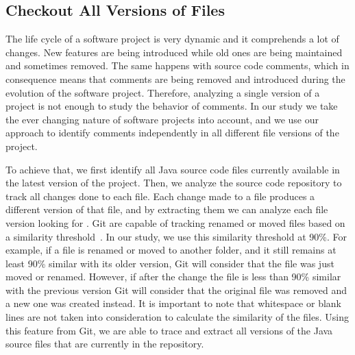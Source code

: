 \subsection{Checkout All Versions of Files}
\label{sub:checkout_all_versions_of_files}

The life cycle of a software project is very dynamic and it comprehends a lot of changes. New features are being introduced while old ones are being maintained and sometimes removed. The same happens with source code comments, which in consequence means that \SATD comments are being removed and introduced during the evolution of the software project. Therefore, analyzing a single version of a project is not enough to study the behavior of \SATD comments. In our study we take the ever changing nature of software projects into account, and we use our approach to identify \SATD comments independently in all different file versions of the project.



To achieve that, we first identify all Java source code files currently available in the latest version of the project. Then, we analyze the source code repository to track all changes done to each file. Each change made to a file produces a different version of that file, and by extracting them we can analyze each file version looking for \SATD. Git are capable of tracking  renamed or moved files based on a similarity threshold~. In our study, we use this similarity threshold at 90\%. For example, if a file is renamed or moved to another folder, and it still remains at least 90\% similar with its older version, Git will consider that the file was just moved or renamed. However, if after the change the file is less than 90\% similar with the previous version Git will consider that the original file was removed and a new one was created instead. It is important to note that whitespace or blank lines are not taken into consideration to calculate the similarity of the files. Using this feature from Git, we are able to trace and extract all versions of the Java source files that are currently in the repository. 

